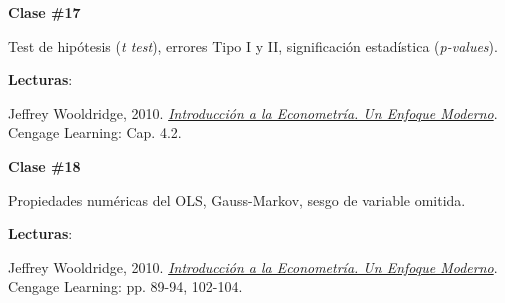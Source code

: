 \documentclass[letterpaper]{article}
\renewenvironment{itemize}{
  \begin{list}{}{
    \setlength{\leftmargin}{1.5em}
  }
}{
  \end{list}
}
\begin{document}
\begin{enumerate}
			\begin{itemize} 
				\item[$\bullet$] {\bf Clase \#17}
					\begin{itemize} 
						\item[$\circ$] Test de hip\'otesis (\emph{t test}), errores Tipo I y II,  significaci\'on estad\'istica (\emph{p-values}). %
						\item[$\circ$] {\bf Lecturas}: 
							\begin{itemize}
								\item[$\diamond$] Jeffrey Wooldridge, 2010. \href{https://github.com/hbahamonde/Metodos_Cuanti_I/raw/master/Readings/Wooldridge.pdf}{\emph{Introducci\'on a la Econometr\'ia. Un Enfoque Moderno}}. Cengage Learning: Cap. 4.2.
							\end{itemize}
					\end{itemize}
			\end{itemize}



			\begin{itemize} 
				\item[$\bullet$] {\bf Clase \#18}
					\begin{itemize} 
						\item[$\circ$] Propiedades num\'ericas del OLS, Gauss-Markov, sesgo de variable omitida. %
						\item[$\circ$] {\bf Lecturas}: 
							\begin{itemize} 
								\item[$\diamond$] Jeffrey Wooldridge, 2010. \href{https://github.com/hbahamonde/Metodos_Cuanti_I/raw/master/Readings/Wooldridge.pdf}{\emph{Introducci\'on a la Econometr\'ia. Un Enfoque Moderno}}. Cengage Learning: pp. 89-94, 102-104.
							\end{itemize}
					\end{itemize}
			\end{itemize}




\end{enumerate}
\end{document}
